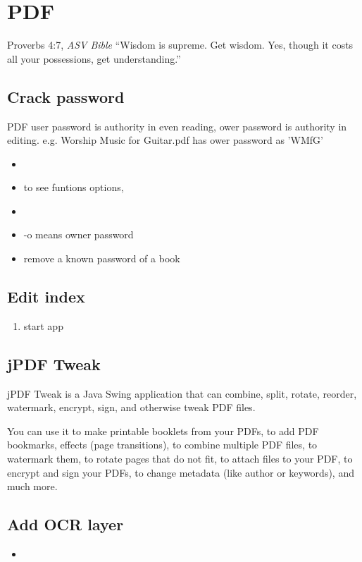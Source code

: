 \chapter{PDF}

\begin{chapquote}{Proverbs 4:7, \textit{ASV Bible}}
``Wisdom is supreme. Get wisdom. Yes, though it costs all your possessions, get understanding.''
\end{chapquote}

\section{Crack password}
PDF user password is authority in even reading, ower password is authority in editing. e.g. Worship Music for Guitar.pdf has ower password as 'WMfG'
\begin{itemize}
\item{}
\item{} to see funtions options,
\item{}
\item{} -o means owner password 
\item{} remove a known password of a book
\end{itemize}

\section{Edit index}
\begin{enumerate}
\item{} start app
\end{enumerate}

\section{jPDF Tweak}
jPDF Tweak is a Java Swing application that can combine, split, rotate, reorder, watermark, encrypt, sign, and otherwise tweak PDF files.

You can use it to make printable booklets from your PDFs, to add PDF bookmarks, effects (page transitions), to combine multiple PDF files, to watermark them, to rotate pages that do not fit, to attach files to your PDF, to encrypt and sign your PDFs, to change metadata (like author or keywords), and much more.

\section{Add OCR layer}
\begin{itemize}
\item{}
\end{itemize}

